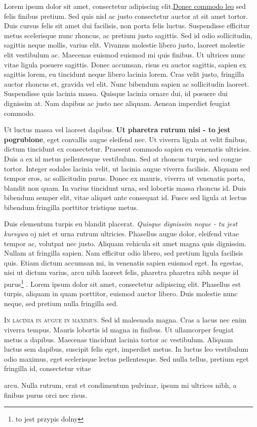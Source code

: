 \documentclass[12pt]{article}
\begin{document}
Lorem ipsum dolor sit amet, consectetur adipiscing elit.\underline{Donec commodo
leo} sed felis finibus pretium. Sed quis nisl ac justo consectetur auctor at sit
amet tortor. Duis cursus felis sit amet dui facilisis, non porta felis luctus. Suspendisse efficitur metus scelerisque nunc rhoncus, ac pretium justo sagittis.
Sed id odio sollicitudin, sagittis neque mollis, varius elit. Vivamus molestie
libero justo, laoreet molestie elit vestibulum ac. Maecenas euismod euismod
mi quis finibus. Ut ultrices nunc vitae ligula posuere sagittis. Donec accumsan, risus eu auctor sagittis, sapien ex sagittis lorem, eu tincidunt neque
libero lacinia lorem. Cras velit justo, fringilla auctor rhoncus et, gravida vel
elit. Nunc bibendum sapien ac sollicitudin laoreet. Suspendisse quis lacinia
massa. Quisque lacinia ornare dui, id posuere dui dignissim at. Nam dapibus
ac justo nec aliquam. Aenean imperdiet feugiat commodo.\par Ut luctus massa vel laoreet dapibus. \textbf{Ut pharetra rutrum nisi - to jest 
pogrubione}, eget convallis augue eleifend nec. Ut viverra ligula at velit finibus, dictum tincidunt ex consectetur. Praesent commodo sapien eu venenatis
ultricies. Duis a ex id metus pellentesque vestibulum. Sed at rhoncus turpis,
sed congue tortor. Integer sodales lacinia velit, ut lacinia augue viverra facilisis. Aliquam sed tempor eros, ac sollicitudin purus. Donec ex mauris, viverra
ut venenatis porta, blandit non quam. In varius tincidunt urna, sed lobortis
massa rhoncus id. Duis bibendum semper elit, vitae aliquet ante consequat
id. Fusce sed ligula at lectus bibendum fringilla porttitor tristique metus.\par
Duis elementum turpis eu blandit placerat. \textit{Quisque dignissim neque - tu
jest kursywa} oj niet et urna rutrum ultricies. Phasellus augue dolor, eleifend
vitae tempor ac, volutpat nec justo. Aliquam vehicula sit amet magna quis
dignissim. Nullam at fringilla sapien. Nam efficitur odio libero, sed pretium
ligula facilisis quis. Etiam dictum accumsan mi, in venenatis sapien euismod
eget. In egestas, nisi ut dictum varius, arcu nibh laoreet felis, pharetra pharetra nibh neque id purus\footnote{to jest przypis dolny}
. Lorem ipsum dolor sit amet, consectetur adipiscing
elit. Phasellus est turpis, aliquam in quam porttitor, euismod auctor libero.
Duis molestie nunc neque, sed pretium nulla fringilla sed.\par
\textsc{In lacinia in augue in maximus}. Sed id malesuada magna. Cras a lacus
nec enim viverra tempus. Mauris lobortis id magna in finibus. Ut
ullamcorper feugiat metus a dapibus. Maecenas tincidunt lacinia tortor ac
vestibulum. Aliquam luctus sem dapibus, suscipit felis eget, imperdiet
metus. In luctus leo vestibulum odio maximus, eget scelerisque lectus
pellentesque. Sed nulla tellus, pretium eget fringilla id, consectetur vitae\par
arcu. Nulla rutrum, erat et condimentum pulvinar, ipsum mi ultrices nibh,
a finibus purus orci nec risus.
\end{document}
